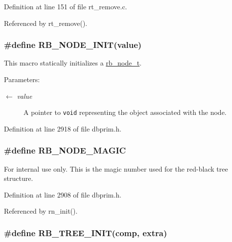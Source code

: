 Definition at line 151 of file rt\_\-remove.c.

Referenced by rt\_\-remove().\hypertarget{group__dbprim__rbtree_ga31}{
\subsubsection[RB\_\-NODE\_\-INIT]{\setlength{\rightskip}{0pt plus 5cm}\#define RB\_\-NODE\_\-INIT(value)}}
\label{group__dbprim__rbtree_ga31}


This macro statically initializes a \hyperlink{group__dbprim__rbtree_ga1}{rb\_\-node\_\-t}.

\begin{Desc}
\item[Parameters:]
\begin{description}
\item[\mbox{$\leftarrow$} {\em value}]A pointer to {\tt void} representing the object associated with the node.\end{description}
\end{Desc}


Definition at line 2918 of file dbprim.h.\hypertarget{group__dbprim__rbtree_ga30}{
\subsubsection[RB\_\-NODE\_\-MAGIC]{\setlength{\rightskip}{0pt plus 5cm}\#define RB\_\-NODE\_\-MAGIC}}
\label{group__dbprim__rbtree_ga30}


\begin{Desc}
\item[For internal use only.]
This is the magic number used for the red-black tree structure.\end{Desc}


Definition at line 2908 of file dbprim.h.

Referenced by rn\_\-init().\hypertarget{group__dbprim__rbtree_ga18}{
\subsubsection[RB\_\-TREE\_\-INIT]{\setlength{\rightskip}{0pt plus 5cm}\#define RB\_\-TREE\_\-INIT(comp, extra)}}
\label{group__dbprim__rbtree_ga18}


